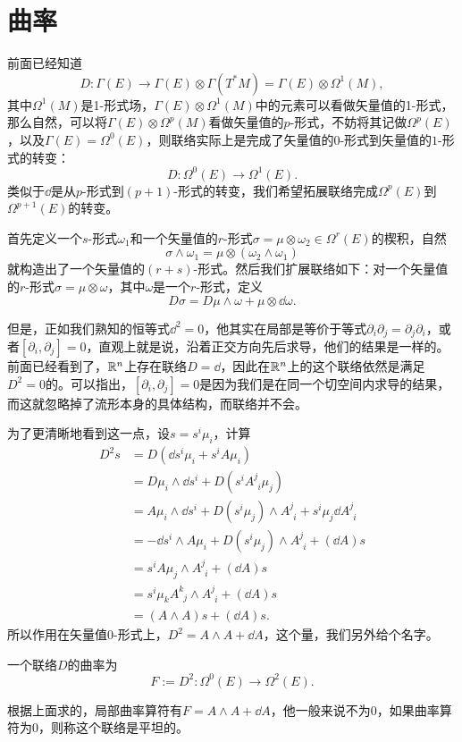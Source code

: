 \section{曲率}
前面已经知道
\[
	D:\Gamma (E)\to\Gamma(E)\otimes \Gamma(T^*M)=\Gamma(E)\otimes \Omega^1(M),
\]
其中$\Omega^1(M)$是1-形式场，$\Gamma(E)\otimes \Omega^1(M)$中的元素可以看做矢量值的1-形式，那么自然，可以将$\Gamma(E)\otimes \Omega^p(M)$看做矢量值的$p$-形式，不妨将其记做$\Omega^p(E)$，以及$\Gamma (E)=\Omega^0 (E)$，则联络实际上是完成了矢量值的$0$-形式到矢量值的$1$-形式的转变：
\[
	D:\Omega^0 (E)\to \Omega^1(E).
\]
类似于$\dd$是从$p$-形式到$(p+1)$-形式的转变，我们希望拓展联络完成$\Omega^p (E)$到$\Omega^{p+1}(E)$的转变。

首先定义一个$s$-形式$\omega_1$和一个矢量值的$r$-形式$\sigma=\mu\otimes\omega_2\in \Omega^r (E)$的楔积，自然
\[
	\sigma\wedge \omega_1=\mu\otimes(\omega_2\wedge \omega_1)
\]
就构造出了一个矢量值的$(r+s)$-形式。然后我们扩展联络如下：对一个矢量值的$r$-形式$\sigma=\mu \otimes \omega$，其中$\omega$是一个$r$-形式，定义
\[
	D\sigma=D\mu \wedge\omega+\mu\otimes \dd \omega.
\]

但是，正如我们熟知的恒等式$\dd^2=0$，他其实在局部是等价于等式$\partial_i \partial_j=\partial_j \partial_i$，或者$[\partial_i,\partial_j]=0$，直观上就是说，沿着正交方向先后求导，他们的结果是一样的。前面已经看到了，$\mathbb{R}^n$上存在联络$D=\dd$，因此在$\mathbb{R}^n$上的这个联络依然是满足$D^2=0$的。可以指出，$[\partial_i,\partial_j]=0$是因为我们是在同一个切空间内求导的结果，而这就忽略掉了流形本身的具体结构，而联络并不会。

为了更清晰地看到这一点，设$s=s^i\mu_i$，计算
\begin{align*}
	D^2 s&=D(\dd s^i \mu_i+s^iA\mu_i)\\
	&=D\mu_i\wedge \dd s^i+D(s^i A^{j}_{\phantom{j}i}\mu_j)\\
	&=A\mu_i\wedge \dd s^i+D(s^i\mu_j)\wedge A^{j}_{\phantom{j}i}+s^i\mu_j\dd A^{j}_{\phantom{j}i}\\
	&=-\dd s^i\wedge A\mu_i+D(s^i\mu_j)\wedge A^{j}_{\phantom{j}i}+(\dd A)s\\
	&=s^i A\mu_j\wedge A^{j}_{\phantom{j}i}+(\dd A)s\\
	&=s^i \mu_k A^{k}_{\phantom{k}j}\wedge A^{j}_{\phantom{j}i}+(\dd A)s\\
	&=(A\wedge A)s+(\dd A)s.
\end{align*}
所以作用在矢量值0-形式上，$D^2=A\wedge A+\dd A$，这个量，我们另外给个名字。
\begin{defi}
一个联络$D$的曲率为
\[
	F:=D^2:\Omega^0(E)\to \Omega^2(E).
\]
\end{defi}
根据上面求的，局部曲率算符有$F=A\wedge A+\dd A$，他一般来说不为0，如果曲率算符为0，则称这个联络是平坦的。

